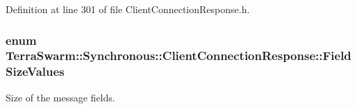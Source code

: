 Definition at line 301 of file Client\-Connection\-Response.\-h.

\hypertarget{class_terra_swarm_1_1_synchronous_1_1_client_connection_response_a3933c56d09c6ccf4f1b533024d9d4b08}{
\subsubsection[{Field\-Size\-Values}]{\setlength{\rightskip}{0pt plus 5cm}enum {\bf Terra\-Swarm\-::\-Synchronous\-::\-Client\-Connection\-Response\-::\-Field\-Size\-Values}\hspace{0.3cm}{\ttfamily [private]}}}\label{class_terra_swarm_1_1_synchronous_1_1_client_connection_response_a3933c56d09c6ccf4f1b533024d9d4b08}


Size of the message fields. 

